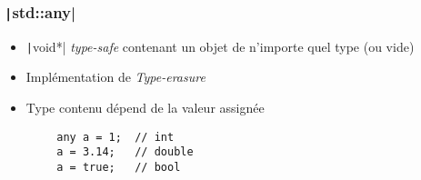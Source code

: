 \documentclass[C++.tex]{subfiles}
\begin{document}
\begin{frame}[fragile]
	\frametitle{\texttt|std::any|}
	\begin{itemize}
		\item \texttt|void*| \textit{type-safe} contenant un objet de n'importe quel type (ou vide)
		\item Implémentation de \textit{Type-erasure}
		\item Type contenu dépend de la valeur assignée
	\end{itemize}

	\begin{verbatim}
		any a = 1;  // int
		a = 3.14;   // double
		a = true;   // bool
	\end{verbatim}

\end{frame}
\end{document}
